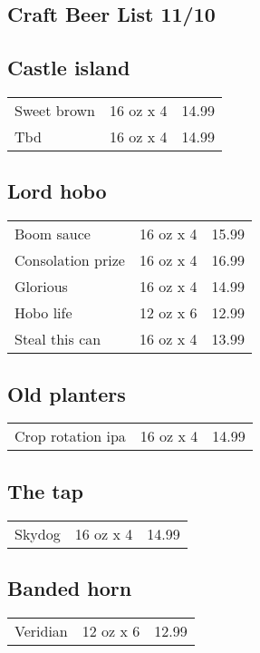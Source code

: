 \documentclass{article}%
\begin{document}
%
\pagestyle{empty}%
\normalsize%
%
\setlength{\columnseprule}{0.5pt}%
\setlength{\columnsep}{1cm}%
\renewcommand{\familydefault}{\sfdefault}%
\sffamily%
\begin{multicols}{3}%
\section*{\selectfont Craft Beer List 11/10}%

%
\subsection*{Castle island}%
\begin{tabular}{l c r}%
Sweet brown&16 oz x 4&14.99\\%
Tbd&16 oz x 4&14.99\\%
\end{tabular}

%
\subsection*{Lord hobo}%
\begin{tabular}{l c r}%
Boom sauce&16 oz x 4&15.99\\%
Consolation prize&16 oz x 4&16.99\\%
Glorious&16 oz x 4&14.99\\%
Hobo life&12 oz x 6&12.99\\%
Steal this can&16 oz x 4&13.99\\%
\end{tabular}

%
\subsection*{Old planters}%
\begin{tabular}{l c r}%
Crop rotation ipa&16 oz x 4&14.99\\%
\end{tabular}

%
\subsection*{The tap}%
\begin{tabular}{l c r}%
Skydog&16 oz x 4&14.99\\%
\end{tabular}

%
\subsection*{Banded horn}%
\begin{tabular}{l c r}%
Veridian&12 oz x 6&12.99\\%
\end{tabular}


\end{multicols}
\end{document}
